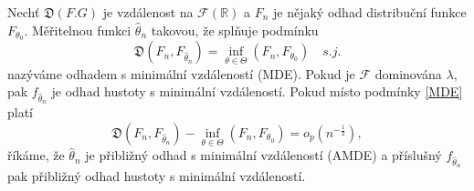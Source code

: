 \begin{definition}
	Nech\v{t} $\mathfrak{D}(F.G)$ je vzdálenost na $\mathcal{F}(\mathbb{R})$ a $F_n$ je nějaký odhad distribuční funkce $F_{\theta_0}$. Měřitelnou funkci $\hat{\theta}_n$ takovou, že spl\v{n}uje podmínku
	\begin{equation}
		\mathfrak{D}(F_n, F_{\hat{\theta}_n}) = \inf_{\theta \in \Theta}(F_n, F_{\theta_0}) \quad s.j.
		\label{MDE}
	\end{equation}
	nazýváme odhadem s minimální vzdáleností (MDE). Pokud je $\mathcal{F}$ dominována $\lambda$, pak $f_{\hat{\theta}_n}$  je odhad hustoty s minimální vzdáleností. Pokud místo podmínky \eqref{MDE} platí 
	\begin{equation}
		\mathfrak{D}(F_n, F_{\hat{\theta}_n}) - \inf_{\theta \in \Theta}(F_n, F_{\theta_0}) = o_p(n^{-\frac{1}{2}}), 
	\end{equation}
	říkáme, že $\hat{\theta}_n$ je přibližný odhad s minimální vzdáleností (AMDE) a příslušný  $f_{\hat{\theta}_n}$ pak přibližný odhad hustoty s minimální vzdáleností.
\end{definition}

